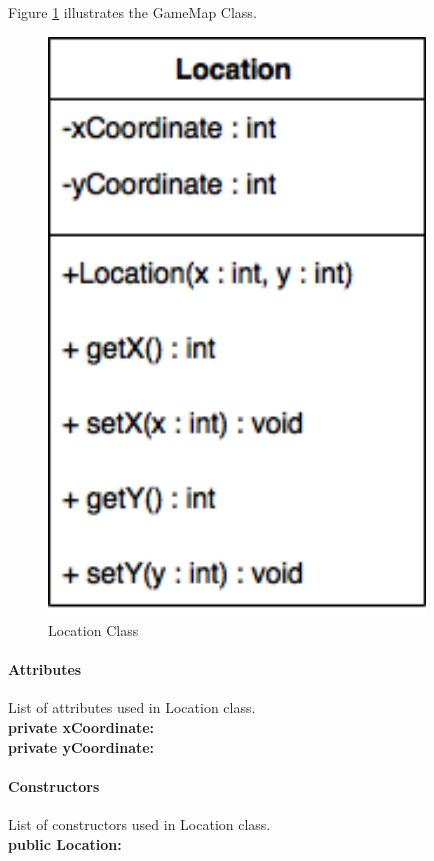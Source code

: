 \documentclass[12pt]{article} %
\begin{document}
Figure \ref{fig:location} illustrates the GameMap Class.
\begin{figure}[h!]
   \centering
   \vspace{10pt}%
   \includegraphics[width=10cm]{location.png}
   \caption{Location Class}
   \label{fig:location}
\end{figure}

\paragraph{Attributes\\}

List of attributes used in Location class.\\
\textbf{private xCoordinate:} \\
\textbf{private yCoordinate:} 


\paragraph{Constructors \\}
List of constructors used in Location class.\\
\textbf{public Location:} 
\end{document}
